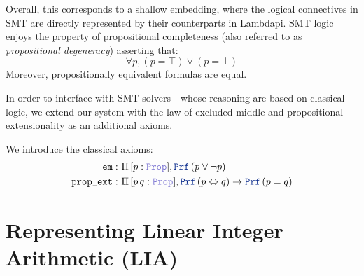 Overall, this corresponds to a shallow embedding, where the logical connectives in SMT are directly represented by their counterparts in Lambdapi.
SMT logic enjoys the property of propositional completeness (also referred to as \emph{propositional degeneracy}) asserting that:
 \[
  \forall p,(p = \top) \lor (p = \bot)
\]
Moreover, propositionally equivalent formulas are equal.

In order to interface with SMT solvers—whose reasoning are based on classical logic,
we extend our system with the law of excluded middle and propositional extensionality as an additional axioms.


\begin{definition}
We introduce the classical axioms:
\begin{align*}
\tt{em} \index{$\tt{em}$}:\ & \Pi\, [p: \prop], \prf\,(p \lor \neg p) \\
\tt{prop\_ext} \index{$\tt{prop\_ext}$}:\ & \Pi\, [p\,q: \prop], \prf\,(p \Leftrightarrow q ) \rightarrow \prf\,(p = q)
\end{align*}
\label{def:classical-facts}
\end{definition}

\section{Representing Linear Integer Arithmetic (\textbf{LIA})}
\label{ssec:encoding-lia}

